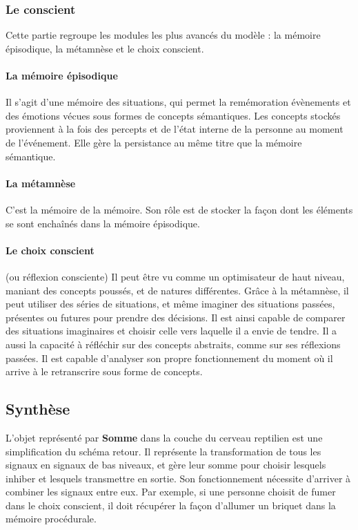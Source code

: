\subsubsection{Le conscient}
Cette partie regroupe les modules les plus avancés du modèle : la mémoire épisodique, la métamnèse et le choix conscient.

\paragraph{La mémoire épisodique} Il s'agit d'une mémoire des situations, qui permet la remémoration évènements et des émotions vécues sous formes de concepts sémantiques. Les concepts stockés proviennent à la fois des percepts et de l’état interne de la personne au moment de l'événement. Elle gère la persistance au même titre que la mémoire sémantique.

\paragraph{La métamnèse} C'est la mémoire de la mémoire. Son rôle est de stocker la
façon dont les éléments se sont enchaînés dans la mémoire épisodique.

\paragraph{Le choix conscient} (ou réflexion consciente) Il peut être vu comme un optimisateur de haut niveau, maniant des concepts poussés, et de natures différentes. Grâce à la métamnèse, il peut utiliser des séries de situations, et même imaginer des situations passées, présentes ou futures pour prendre des décisions. Il est ainsi capable de comparer des situations imaginaires et choisir celle vers laquelle il a envie de tendre. Il a aussi la capacité à réfléchir sur des concepts abstraits, comme sur ses réflexions passées. Il est capable d'analyser son propre fonctionnement du moment où il arrive à le retranscrire sous forme de concepts.

\subsection{Synthèse}
L’objet représenté par \textbf{Somme} dans la couche du cerveau reptilien est une simplification du schéma retour. Il représente la transformation de tous les signaux en signaux de bas niveaux, et gère leur somme pour choisir lesquels inhiber et lesquels transmettre en sortie. Son fonctionnement nécessite d'arriver à combiner les signaux entre eux. Par exemple, si une personne choisit de fumer dans le choix conscient, il doit récupérer la façon d'allumer un briquet dans la mémoire procédurale.
